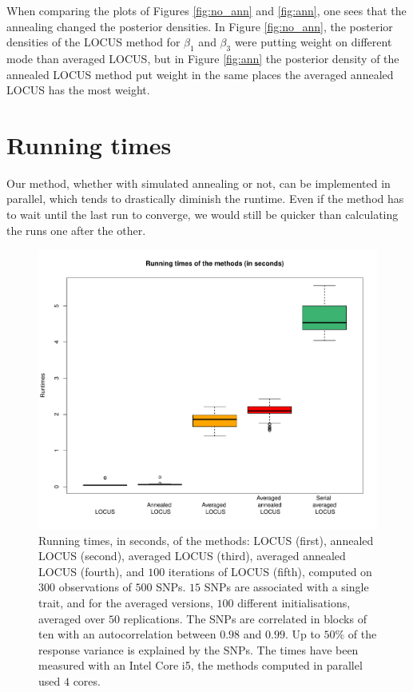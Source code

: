 \documentclass[a4paper, 11pt]{report}
\numberwithin{equation}{chapter}
\begin{document}
When comparing the plots of Figures \ref{fig:no_ann} and \ref{fig:ann}, one sees that the annealing changed the posterior densities. In Figure \ref{fig:no_ann}, the posterior densities of the LOCUS method for $\beta_1$ and $\beta_3$ were putting weight on different mode than averaged LOCUS, but in Figure \ref{fig:ann} the posterior density of the annealed LOCUS method put weight in the same places the averaged annealed LOCUS has the most weight. 

\section{Running times}

Our method, whether with simulated annealing or not, can be implemented in parallel, which tends to drastically diminish the runtime. Even if the method has to wait until the last run to converge, we would still be quicker than calculating the runs one after the other.

\begin{figure}[h]
\centering
\includegraphics[width=5in,bb= 0 0 705 581]{images/runtime.pdf}

\caption{\label{fig:runtime} Running times, in seconds, of the methods: LOCUS (first), annealed LOCUS (second), averaged LOCUS (third), averaged annealed LOCUS (fourth), and $100$ iterations of LOCUS (fifth), computed on $300$ observations of $500$ SNPs. $15$ SNPs are associated with a single trait, and for the averaged versions, $100$ different initialisations, averaged over $50$ replications. The SNPs are correlated in blocks of ten with an autocorrelation between $0.98$ and $0.99$. Up to $50\%$ of the response variance is explained by the SNPs. The times have been measured with an Intel Core i5, the methods computed in parallel used $4$ cores.}
\end{figure}
\end{document}
